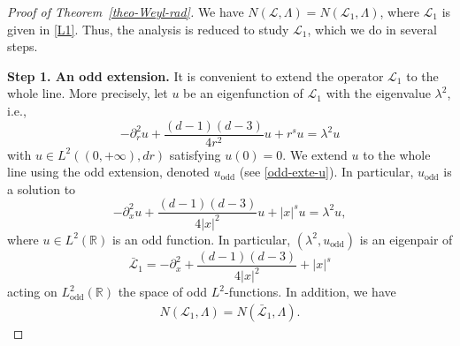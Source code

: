 \documentclass[%
11pt,  reqno]{amsart}
\theoremstyle{remarkstyle}
\newcommand{\1}{\hspace{0.2mm}\text{I}\hspace{0.2mm}}
\renewcommand{\L}{\mathcal{L}}
\newcommand{\ld}{\lambda}
\newcommand{\Ld}{\Lambda}
\numberwithin{equation}{section}
\numberwithin{theorem}{section}
\begin{document}
	\begin{proof}[Proof of Theorem~\ref{theo-Weyl-rad}]
		We have $N(\L,\Lambda) = N(\L_1, \Lambda)$, where $\L_1$ is given in \eqref{L1}. Thus, the analysis is reduced to study $\L_1$, which we do in several steps.
		
		{\bf Step 1. An odd extension.} It is convenient to extend the operator $\L_1$ to the whole line. More precisely, let $u$ be an eigenfunction of $\L_1$ with the eigenvalue $\ld^2$, i.e.,
		$$
		-\partial^2_r u + \frac{(d-1)(d-3)}{4r^2} u + r^s u = \ld^2 u
		$$
		with $u \in L^2((0,+\infty),dr)$ satisfying $u(0)=0$. We extend $u$ to the whole line using the odd extension, denoted $u_{\text{odd}}$ (see \eqref{odd-exte-u}). In particular, $u_{\text{odd}}$ is a solution to 
		$$
		-\partial^2_x u +\frac{(d-1)(d-3)}{4|x|^2}u + |x|^s u = \ld^2 u,
		$$
		where $u \in L^2(\mathbb{R})$ is an odd function. In particular, $(\ld^2, u_{\text{odd}})$ is an eigenpair of
		\[
		\bar{\L}_1 = -\partial^2_x + \frac{(d-1)(d-3)}{4|x|^2} + |x|^s
		\]
		acting on $L^2_{\text{odd}}(\mathbb{R})$ the space of odd $L^2$-functions. In addition, we have 
		\begin{align}\label{odd-exte}
			N(\L_1, \Ld) = N(\bar{\L}_1, \Ld).
		\end{align} 
		

\end{proof}
\end{document}

